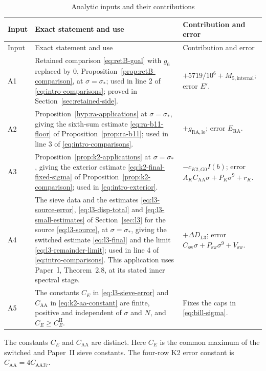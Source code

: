 \begin{longtable}{@{}p{.09\linewidth}p{.57\linewidth}p{.30\linewidth}@{}}
\caption{Analytic inputs and their contributions}\label{tab:intro-inputs}\\
\hline
Input & Exact statement and use & Contribution and error\\
\hline
\endfirsthead
\hline
Input & Exact statement and use & Contribution and error\\
\hline
\endhead
A1 & Retained comparison \eqref{eq:retB-goal} with $g_6$ replaced by $0$,
Proposition~\ref{prop:retB-comparison}, at $\sigma=\sigma_*$; used in line 2
of \eqref{eq:intro-comparisons}; proved in Section~\ref{sec:retained-side}.
& $+5719/10^6+M_{5,\mathrm{internal}}$; error $E'$.\\
A2 & Proposition~\ref{hyp:ra-applications} at $\sigma=\sigma_*$, giving the
sixth-sum estimate \eqref{eq:ra-b11-floor} of
Proposition~\ref{prop:ra-b11}; used in line 3 of
\eqref{eq:intro-comparisons}. &
$+g_{\mathrm{RA,lo}}$; error $E_{\mathrm{RA}}$.\\
A3 & Proposition~\ref{prop:k2-applications} at $\sigma=\sigma_*$, giving the
exterior estimate \eqref{eq:k2-final-fixed-sigma} of
Proposition~\ref{prop:k2-comparison}; used in \eqref{eq:intro-exterior}. &
$-c_{K2,G0}I(b)$; error
$A_KC_{\mathrm{AA}}\sigma+P_K\sigma^9+r_K$.\\
A4 & The sieve data and the estimates \eqref{eq:l3-source-error},
\eqref{eq:l3-disp-total} and \eqref{eq:l3-small-estimates} of
Section~\ref{sec:l3} for the source \eqref{eq:l3-source}, at
$\sigma=\sigma_*$, giving the switched estimate \eqref{eq:l3-final} and the
limit \eqref{eq:l3-remainder-limit}; used in line 4 of
\eqref{eq:intro-comparisons}. This application uses Paper~I,
Theorem~2.8, at its stated inner spectral stage. &
$+\Delta D_{L3}$; error
$C_{\mathrm{sw}}\sigma+P_{\mathrm{sw}}\sigma^9+V_{\mathrm{sw}}$.\\
A5 & The constants $C_E$ in \eqref{eq:l3-sieve-error} and
$C_{\mathrm{AA}}$ in \eqref{eq:k2-aa-constant} are finite, positive and
independent of $\sigma$ and $N$, and $C_E\ge C_E^{\mathrm{II}}$. &
Fixes the caps in \eqref{eq:bill-sigma}.\\
\hline
\end{longtable}
\endgroup

The constants $C_E$ and $C_{\mathrm{AA}}$ are distinct. Here $C_E$ is the
common maximum of the switched and Paper~II sieve constants.
The four-row K2 error constant is $C_{\mathrm{AA}}=4C_{\mathrm{AA37}}$.

